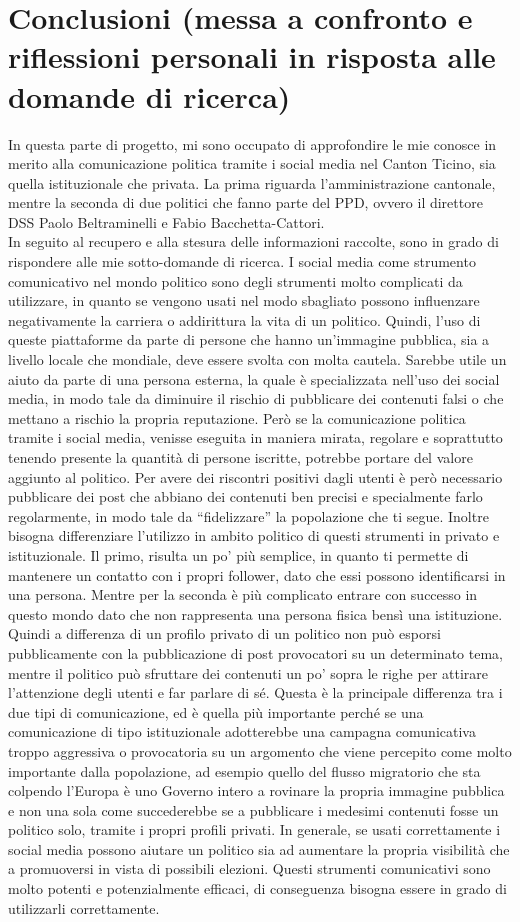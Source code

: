 \section{Conclusioni (messa a confronto e riflessioni personali in risposta alle domande di ricerca)}
In questa parte di progetto, mi sono occupato di approfondire le mie conosce in merito alla comunicazione politica tramite i social media nel Canton Ticino, sia quella istituzionale che privata. La prima riguarda l’amministrazione cantonale, mentre la seconda di due politici che fanno parte del PPD, ovvero il direttore DSS Paolo Beltraminelli e Fabio Bacchetta-Cattori.\\
In seguito al recupero e alla stesura delle informazioni raccolte, sono in grado di rispondere alle mie sotto-domande di ricerca. I social media come strumento comunicativo nel mondo politico sono degli strumenti molto complicati da utilizzare, in quanto se vengono usati nel modo sbagliato possono influenzare negativamente la carriera o addirittura la vita di un politico. Quindi, l’uso di queste piattaforme da parte di persone che hanno un’immagine pubblica, sia a livello locale che mondiale, deve essere svolta con molta cautela. Sarebbe utile un aiuto da parte di una persona esterna, la quale è specializzata nell’uso dei social media, in modo tale da diminuire il rischio di pubblicare dei contenuti falsi o che mettano a rischio la propria reputazione. Però se la comunicazione politica tramite i social media, venisse eseguita in maniera mirata, regolare e soprattutto tenendo presente la quantità di persone iscritte, potrebbe portare del valore aggiunto al politico. Per avere dei riscontri positivi dagli utenti è però necessario pubblicare dei post che abbiano dei contenuti ben precisi e specialmente farlo regolarmente, in modo tale da “fidelizzare” la popolazione che ti segue. Inoltre bisogna differenziare l’utilizzo in ambito politico di questi strumenti in privato e istituzionale. Il primo, risulta un po’ più semplice, in quanto ti permette di mantenere un contatto con i propri follower, dato che essi possono identificarsi in una persona. Mentre per la seconda è più complicato entrare con successo in questo mondo dato che non rappresenta una persona fisica bensì una istituzione. Quindi a differenza di un profilo privato di un politico non può esporsi pubblicamente con la pubblicazione di post provocatori su un determinato tema, mentre il politico può sfruttare dei contenuti un po’ sopra le righe per attirare l’attenzione degli utenti e far parlare di sé. Questa è la principale differenza tra i due tipi di comunicazione, ed è quella più importante perché se una comunicazione di tipo istituzionale adotterebbe una campagna comunicativa troppo aggressiva o provocatoria su un argomento che viene percepito come molto importante dalla popolazione, ad esempio quello del flusso migratorio che sta colpendo l’Europa è uno Governo intero a rovinare la propria immagine pubblica e non una sola come succederebbe se a pubblicare i medesimi contenuti fosse un politico solo, tramite i propri profili privati. In generale, se usati correttamente i social media possono aiutare un politico sia ad aumentare la propria visibilità che a promuoversi in vista di possibili elezioni. Questi strumenti comunicativi sono molto potenti e potenzialmente efficaci, di conseguenza bisogna essere in grado di utilizzarli correttamente. 
